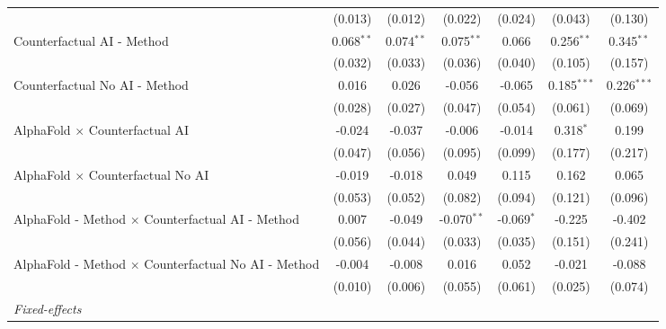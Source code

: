 \begin{tabular}{lcccccc}
                                                              & (0.013)      & (0.012)      & (0.022)       & (0.024)      & (0.043)        & (0.130)\\   
   Counterfactual AI - Method                                 & 0.068$^{**}$ & 0.074$^{**}$ & 0.075$^{**}$  & 0.066        & 0.256$^{**}$   & 0.345$^{**}$\\   
                                                              & (0.032)      & (0.033)      & (0.036)       & (0.040)      & (0.105)        & (0.157)\\   
   Counterfactual No AI - Method                              & 0.016        & 0.026        & -0.056        & -0.065       & 0.185$^{***}$  & 0.226$^{***}$\\   
                                                              & (0.028)      & (0.027)      & (0.047)       & (0.054)      & (0.061)        & (0.069)\\   
   AlphaFold $\times$ Counterfactual AI                       & -0.024       & -0.037       & -0.006        & -0.014       & 0.318$^{*}$    & 0.199\\   
                                                              & (0.047)      & (0.056)      & (0.095)       & (0.099)      & (0.177)        & (0.217)\\   
   AlphaFold $\times$ Counterfactual No AI                    & -0.019       & -0.018       & 0.049         & 0.115        & 0.162          & 0.065\\   
                                                              & (0.053)      & (0.052)      & (0.082)       & (0.094)      & (0.121)        & (0.096)\\   
   AlphaFold - Method $\times$ Counterfactual AI - Method     & 0.007        & -0.049       & -0.070$^{**}$ & -0.069$^{*}$ & -0.225         & -0.402\\   
                                                              & (0.056)      & (0.044)      & (0.033)       & (0.035)      & (0.151)        & (0.241)\\   
   AlphaFold - Method $\times$ Counterfactual No AI - Method  & -0.004       & -0.008       & 0.016         & 0.052        & -0.021         & -0.088\\   
                                                              & (0.010)      & (0.006)      & (0.055)       & (0.061)      & (0.025)        & (0.074)\\   
   \midrule
   \emph{Fixed-effects}\\

\end{tabular}
